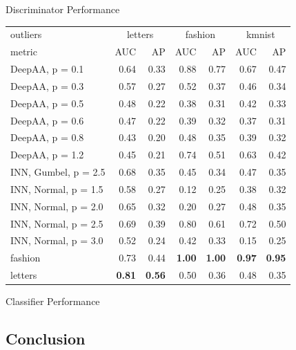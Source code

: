 \documentclass[aspectratio=169]{beamer}
\begin{document}
\begin{frame}{Discriminator Performance}
\begin{table}[htpb]
\begin{tabular}{lrrrrrr}
\toprule
{outliers} & \multicolumn{2}{c}{letters} & \multicolumn{2}{c}{fashion} & \multicolumn{2}{c}{kmnist} \\
{metric} & {AUC} & {AP} & {AUC} & {AP} & {AUC} & {AP} \\
\midrule
DeepAA, p = 0.1 & 0.64 & 0.33 & 0.88 & 0.77 & 0.67 & 0.47 \\
DeepAA, p = 0.3 & 0.57 & 0.27 & 0.52 & 0.37 & 0.46 & 0.34 \\
DeepAA, p = 0.5 & 0.48 & 0.22 & 0.38 & 0.31 & 0.42 & 0.33 \\
DeepAA, p = 0.6 & 0.47 & 0.22 & 0.39 & 0.32 & 0.37 & 0.31 \\
DeepAA, p = 0.8 & 0.43 & 0.20 & 0.48 & 0.35 & 0.39 & 0.32 \\
DeepAA, p = 1.2 & 0.45 & 0.21 & 0.74 & 0.51 & 0.63 & 0.42 \\
INN, Gumbel, p = 2.5 & 0.68 & 0.35 & 0.45 & 0.34 & 0.47 & 0.35 \\
INN, Normal, p = 1.5 & 0.58 & 0.27 & 0.12 & 0.25 & 0.38 & 0.32 \\
INN, Normal, p = 2.0 & 0.65 & 0.32 & 0.20 & 0.27 & 0.48 & 0.35 \\
INN, Normal, p = 2.5 & 0.69 & 0.39 & 0.80 & 0.61 & 0.72 & 0.50 \\
INN, Normal, p = 3.0 & 0.52 & 0.24 & 0.42 & 0.33 & 0.15 & 0.25 \\
fashion & 0.73 & 0.44 & \bfseries 1.00 & \bfseries 1.00 & \bfseries 0.97 & \bfseries 0.95 \\
letters & \bfseries 0.81 & \bfseries 0.56 & 0.50 & 0.36 & 0.48 & 0.35 \\
\bottomrule
\end{tabular}
\end{table}
\end{frame}

\begin{frame}{Classifier Performance}
\begin{table}[htpb]
	
\end{table}
\end{frame}

\subsection{Conclusion}
\end{document}
